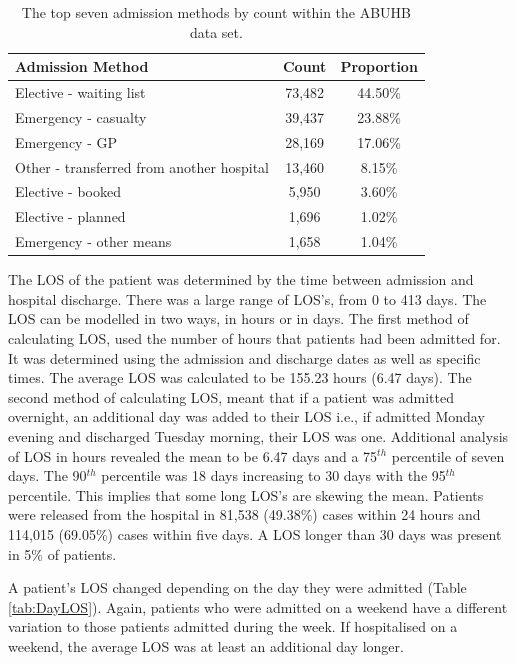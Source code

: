 \documentclass[../thesis.tex]{subfiles}
\begin{document}
\begin{table}[h!]
    \centering
    \begin{tabular}{lcc}\toprule
    \textbf{Admission Method} & \textbf{Count} &\textbf{Proportion} \\ \midrule
Elective - waiting list& 73,482 & 44.50\%\\
Emergency - casualty&	39,437 &23.88\%\\
Emergency - GP&  	28,169&17.06\%\\
Other - transferred from another hospital  & 	13,460&8.15\%\\
Elective - booked  &5,950 & 3.60\%\\
Elective - planned&1,696 & 1.02\%\\
Emergency - other means&1,658 & 1.04\%\\
 \bottomrule
    \end{tabular}
    \caption{The top seven admission methods by count within the ABUHB data set.}
    \label{tab:AdmissionMethod}
\end{table}

The LOS of the patient was determined by the time between admission and hospital discharge. There was a large range of LOS's, from 0 to 413 days. The LOS can be modelled in two ways, in hours or in days. The first method of calculating LOS, used the number of hours that patients had been admitted for. It was determined using the admission and discharge dates as well as specific times. The average LOS was calculated to be 155.23 hours (6.47 days). The second method of calculating LOS, meant that if a patient was admitted overnight, an additional day was added to their LOS i.e., if admitted Monday evening and discharged Tuesday morning, their LOS was one. Additional analysis of LOS in hours revealed the mean to be 6.47 days and a 75$^{th}$ percentile of seven days. The 90$^{th}$ percentile was 18 days increasing to 30 days with the 95$^{th}$ percentile. This implies that some long LOS's are skewing the mean. Patients were released from the hospital in 81,538 (49.38\%) cases within 24 hours and 114,015 (69.05\%) cases within five days. A LOS longer than 30 days was present in 5\% of patients.

A patient's LOS changed depending on the day they were admitted (Table \ref{tab:DayLOS}). Again, patients who were admitted on a weekend have a different variation to those patients admitted during the week. If hospitalised on a weekend, the average LOS was at least an additional day longer.
\end{document}
